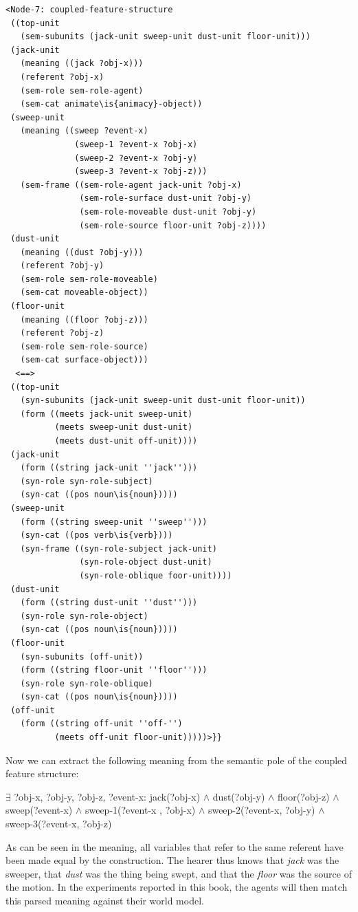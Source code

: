 \ea
\begin{lstlisting}
<Node-7: coupled-feature-structure
 ((top-unit
   (sem-subunits (jack-unit sweep-unit dust-unit floor-unit)))
 (jack-unit
   (meaning ((jack ?obj-x)))
   (referent ?obj-x)
   (sem-role sem-role-agent)
   (sem-cat animate\is{animacy}-object))
 (sweep-unit
   (meaning ((sweep ?event-x)
              (sweep-1 ?event-x ?obj-x)
              (sweep-2 ?event-x ?obj-y)
              (sweep-3 ?event-x ?obj-z)))
   (sem-frame ((sem-role-agent jack-unit ?obj-x)
               (sem-role-surface dust-unit ?obj-y)
               (sem-role-moveable dust-unit ?obj-y)
               (sem-role-source floor-unit ?obj-z))))
 (dust-unit
   (meaning ((dust ?obj-y)))
   (referent ?obj-y)
   (sem-role sem-role-moveable)
   (sem-cat moveable-object))
 (floor-unit
   (meaning ((floor ?obj-z)))
   (referent ?obj-z)
   (sem-role sem-role-source)
   (sem-cat surface-object)))
  <==>
 ((top-unit
   (syn-subunits (jack-unit sweep-unit dust-unit floor-unit))
   (form ((meets jack-unit sweep-unit) 
          (meets sweep-unit dust-unit)
          (meets dust-unit off-unit)))) 
 (jack-unit
   (form ((string jack-unit ''jack'')))
   (syn-role syn-role-subject)
   (syn-cat ((pos noun\is{noun}))))
 (sweep-unit
   (form ((string sweep-unit ''sweep'')))
   (syn-cat ((pos verb\is{verb})))
   (syn-frame ((syn-role-subject jack-unit)
               (syn-role-object dust-unit)
               (syn-role-oblique foor-unit))))
 (dust-unit
   (form ((string dust-unit ''dust'')))
   (syn-role syn-role-object)
   (syn-cat ((pos noun\is{noun}))))
 (floor-unit
   (syn-subunits (off-unit))
   (form ((string floor-unit ''floor'')))
   (syn-role syn-role-oblique)
   (syn-cat ((pos noun\is{noun}))))
 (off-unit
   (form ((string off-unit ''off-'') 
          (meets off-unit floor-unit)))))>}}

\end{lstlisting}
\z

Now we can extract the following meaning from the semantic pole of the coupled feature structure:

\ea
$\exists$ ?obj-x, ?obj-y, ?obj-z, ?event-x: jack(?obj-x) $\wedge$ dust(?obj-y) $\wedge$ floor(?obj-z) $\wedge$ sweep(?event-x) $\wedge$ sweep-1(?event-x , ?obj-x) $\wedge$ sweep-2(?event-x, ?obj-y) $\wedge$ sweep-3(?event-x, ?obj-z)
\z

As can be seen in the meaning, all variables that refer to the same referent have been made equal by the construction. The hearer thus knows that {\em jack} was the sweeper, that {\em dust} was the thing being swept, and that the {\em floor} was the source of the motion. In the experiments reported in this book, the agents will then match this parsed meaning against their world model.

